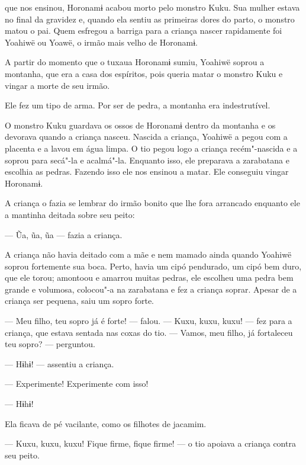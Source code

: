 
 que nos ensinou, Horonamɨ acabou morto pelo monstro Kuku.
Sua mulher estava no final da gravidez e, quando ela sentiu as primeiras
dores do parto, o monstro matou o pai. Quem esfregou a barriga para a
criança nascer rapidamente foi Yoahiwë ou Yoawë, o irmão mais velho de
Horonamɨ. 

A partir do momento que o tuxaua Horonamɨ sumiu, Yoahiwë soprou a
montanha, que era a casa dos espíritos, pois queria matar o monstro Kuku
e vingar a morte de seu irmão. 

Ele fez um tipo de arma. Por ser de pedra, a montanha era
indestrutível. 

O monstro Kuku guardava os ossos de Horonamɨ dentro da montanha e os
devorava quando a criança nasceu. Nascida a criança, Yoahiwë a pegou com
a placenta e a lavou em água limpa. O tio pegou logo a criança
recém"-nascida e a soprou para secá"-la e acalmá"-la. Enquanto isso, ele
preparava a zarabatana e escolhia as pedras. Fazendo isso ele nos
ensinou a matar. Ele conseguiu vingar Horonamɨ. 

A criança o fazia se lembrar do irmão bonito que lhe fora arrancado
enquanto ele a mantinha deitada sobre seu peito:

--- Ũa, ũa, ũa --- fazia a criança. 

A criança não havia deitado com a mãe e nem mamado ainda quando Yoahiwë
soprou fortemente sua boca. Perto, havia um cipó pendurado, um cipó bem
duro, que ele torou; amontoou e amarrou muitas pedras, ele escolheu uma
pedra bem grande e volumosa, colocou"-a na zarabatana e fez a criança
soprar. Apesar de a criança ser pequena, saiu um sopro forte. 

--- Meu filho, teu sopro já é forte! --- falou. --- Kuxu, kuxu,
kuxu! --- fez para a criança, que estava sentada nas coxas do
tio. --- Vamos, meu filho, já fortaleceu teu sopro? --- perguntou.

--- Hɨhɨ! --- assentiu a criança. 

--- Experimente! Experimente com isso! 

--- Hɨhɨ! 

Ela ficava de pé vacilante, como os filhotes de jacamim. 

--- Kuxu, kuxu, kuxu! Fique firme, fique firme! --- o tio apoiava a
criança contra seu peito. 

